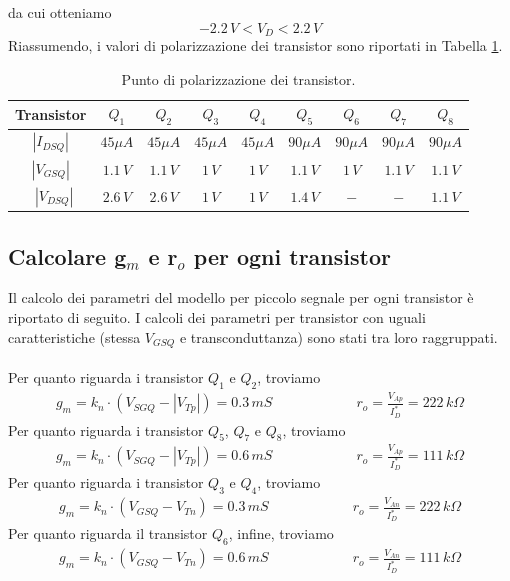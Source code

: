 \documentclass[a4paper,10pt]{article}
\begin{document}
da cui otteniamo
\begin{equation}
\label{valorisat}
-2.2\,V < V_D < 2.2\,V
\end{equation}
Riassumendo, i valori di polarizzazione dei transistor sono riportati in Tabella \ref{tabellapol}.
\begin{table}[h!]
\begin{center}
\begin{tabular}{ |c|c|c|c|c|c|c|c|c| } 
 \hline
   Transistor & $Q_1$ & $Q_2$ & $Q_3$ & $Q_4$ & $Q_5$ & $Q_6$ & $Q_7$ & $Q_8$ \\ 
 \hline
 $\left| I_{DSQ} \right|$ & $45\mu A$ & $45\mu A$ & $45\mu A$ & $45\mu A$ & $90\mu A$ & $90\mu A$ & $90\mu A$ & $90\mu A$ \\
 $\left| V_{GSQ} \right|$ & $1.1\,V$ & $1.1\,V$ & $1\,V$ & $1\,V$ & $1.1\,V$ & $1\,V$ & $1.1\,V$ & $1.1\,V$ \\ 
 \
 $\left| V_{DSQ} \right|$ & $2.6\,V$ & $2.6\,V$ & $1\,V$ & $1\,V$ & $1.4\,V$ & $-$ & $-$ & $1.1\,V$ \\ 
 \hline
\end{tabular}
 \caption{Punto di polarizzazione dei transistor.}
\label{tabellapol}
\end{center}
\end{table}

\newpage
\subsection{Calcolare g$_m$ e r$_o$ per ogni transistor}
Il calcolo dei parametri del modello per piccolo segnale per ogni transistor è riportato di seguito. I calcoli dei parametri per transistor con uguali caratteristiche (stessa $V_{GSQ}$ e transconduttanza) sono stati tra loro raggruppati.\\ \\
Per quanto riguarda i transistor $Q_1$ e $Q_2$, troviamo
\begin{align*}
g_m = k_n \cdot (V_{SGQ}- \left| V_{Tp} \right|) = 0.3\,mS \qquad \qquad \qquad r_o = \frac{V_{Ap}}{I^*_D} = 222\,k\Omega
\end{align*}
Per quanto riguarda i transistor $Q_5$, $Q_7$ e $Q_8$, troviamo
\begin{align*}
g_m = k_n \cdot (V_{SGQ}- \left| V_{Tp} \right|) = 0.6\,mS \qquad \qquad \qquad r_o = \frac{V_{Ap}}{I^*_D} = 111\,k\Omega
\end{align*}
Per quanto riguarda i transistor $Q_3$ e $Q_4$, troviamo
\begin{align*}
g_m = k_n \cdot (V_{GSQ}- V_{Tn}) = 0.3\,mS \qquad \qquad \qquad r_o = \frac{V_{An}}{I^*_D} = 222\,k\Omega
\end{align*}
Per quanto riguarda il transistor $Q_6$, infine, troviamo
\begin{align*}
g_m = k_n \cdot (V_{GSQ}- V_{Tn}) = 0.6\,mS \qquad \qquad \qquad r_o = \frac{V_{An}}{I^*_D} = 111\,k\Omega
\end{align*}
\end{document}
